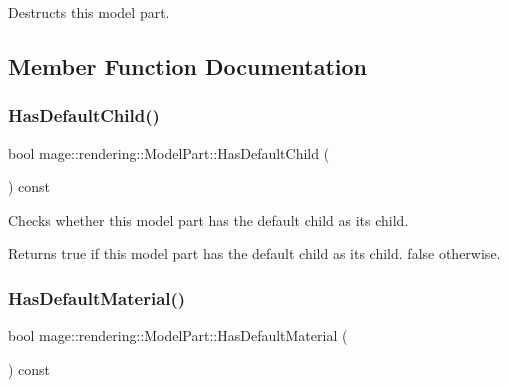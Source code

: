 Destructs this model part. 

\subsection{Member Function Documentation}
\mbox{\label{structmage_1_1rendering_1_1_model_part_ab4118a267808c18556b0fa10949bcb0b}} 
\subsubsection{\texorpdfstring{Has\+Default\+Child()}{HasDefaultChild()}}
{\footnotesize\ttfamily bool mage\+::rendering\+::\+Model\+Part\+::\+Has\+Default\+Child (\begin{DoxyParamCaption}{ }\end{DoxyParamCaption}) const\hspace{0.3cm}{\ttfamily [noexcept]}}

Checks whether this model part has the default child as its child.

\begin{DoxyReturn}{Returns}
{\ttfamily true} if this model part has the default child as its child. {\ttfamily false} otherwise. 
\end{DoxyReturn}
\mbox{\label{structmage_1_1rendering_1_1_model_part_aae8cebe1ec39e939b53fc3f7330984a8}} 
\subsubsection{\texorpdfstring{Has\+Default\+Material()}{HasDefaultMaterial()}}
{\footnotesize\ttfamily bool mage\+::rendering\+::\+Model\+Part\+::\+Has\+Default\+Material (\begin{DoxyParamCaption}{ }\end{DoxyParamCaption}) const\hspace{0.3cm}{\ttfamily [noexcept]}}

